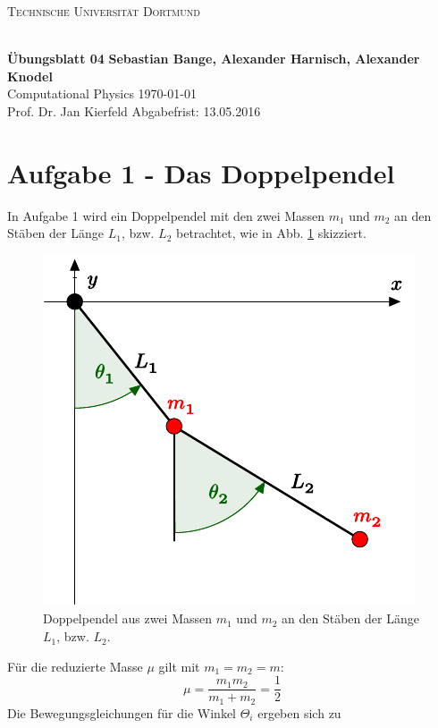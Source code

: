
\newcommand\OverfullCenter[1]{\noindent\makebox[\linewidth]{#1}}

\noindent
\centerline{\small{\textsc{Technische Universität Dortmund}}} \\
\large\textbf{Übungsblatt 04} \hfill \footnotesize\textbf{Sebastian Bange, Alexander Harnisch, Alexander Knodel} \\
\normalsize Computational Physics \hfill \today \\
Prof. Dr. Jan Kierfeld \hfill Abgabefrist: 13.05.2016\\
\noindent\makebox[\linewidth]{\rule{\textwidth}{0.4pt}}
\section*{Aufgabe 1 - Das Doppelpendel}
In Aufgabe 1 wird ein Doppelpendel mit den zwei Massen $m_1$ und $m_2$ an den Stäben der Länge $L_1$, bzw. $L_2$ betrachtet, wie in Abb. \ref{fig:pendel} skizziert.
\begin{figure}
	\centering
	\includegraphics{./blatt.pdf}
	\caption{Doppelpendel aus zwei Massen $m_1$ und $m_2$ an den Stäben der Länge $L_1$, bzw. $L_2$.}
	\label{fig:pendel}
\end{figure}
Für die reduzierte Masse $\mu$ gilt mit $m_1 = m_2 = m$:
\begin{equation}
\mu = \frac{m_1m_2}{m_1 + m_2} = \frac{1}{2}
\label{eq:redMasse}
\end{equation}
Die Bewegungsgleichungen für die Winkel $\Theta_i$ ergeben sich zu
